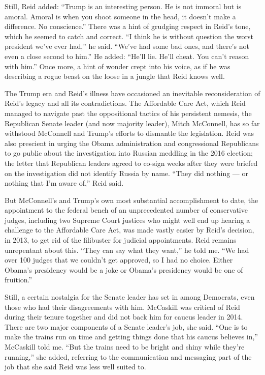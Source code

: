 Still, Reid added: ``Trump is an interesting person. He is not immoral
but is amoral. Amoral is when you shoot someone in the head, it doesn't
make a difference. No conscience.'' There was a hint of grudging respect
in Reid's tone, which he seemed to catch and correct. ``I think he is
without question the worst president we've ever had,'' he said. ``We've
had some bad ones, and there's not even a close second to him.'' He
added: ``He'll lie. He'll cheat. You can't reason with him.'' Once more,
a hint of wonder crept into his voice, as if he was describing a rogue
beast on the loose in a jungle that Reid knows well.

The Trump era and Reid's illness have occasioned an inevitable
reconsideration of Reid's legacy and all its contradictions. The
Affordable Care Act, which Reid managed to navigate past the
oppositional tactics of his persistent nemesis, the Republican Senate
leader (and now majority leader), Mitch McConnell, has so far withstood
McConnell and Trump's efforts to dismantle the legislation. Reid was
also prescient in urging the Obama administration and congressional
Republicans to go public about the investigation into Russian meddling
in the 2016 election; the letter that Republican leaders agreed to
co-sign weeks after they were briefed on the investigation did not
identify Russia by name. ``They did nothing --- or nothing that I'm
aware of,'' Reid said.

But McConnell's and Trump's own most substantial accomplishment to date,
the appointment to the federal bench of an unprecedented number of
conservative judges, including two Supreme Court justices who might well
end up hearing a challenge to the Affordable Care Act, was made vastly
easier by Reid's decision, in 2013, to get rid of the filibuster for
judicial appointments. Reid remains unrepentant about this. ``They can
say what they want,'' he told me. ``We had over 100 judges that we
couldn't get approved, so I had no choice. Either Obama's presidency
would be a joke or Obama's presidency would be one of fruition.''

Still, a certain nostalgia for the Senate leader has set in among
Democrats, even those who had their disagreements with him. McCaskill
was critical of Reid during their tenure together and did not back him
for caucus leader in 2014. There are two major components of a Senate
leader's job, she said. ``One is to make the trains run on time and
getting things done that his caucus believes in,'' McCaskill told me.
``But the trains need to be bright and shiny while they're running,''
she added, referring to the communication and messaging part of the job
that she said Reid was less well suited to.

